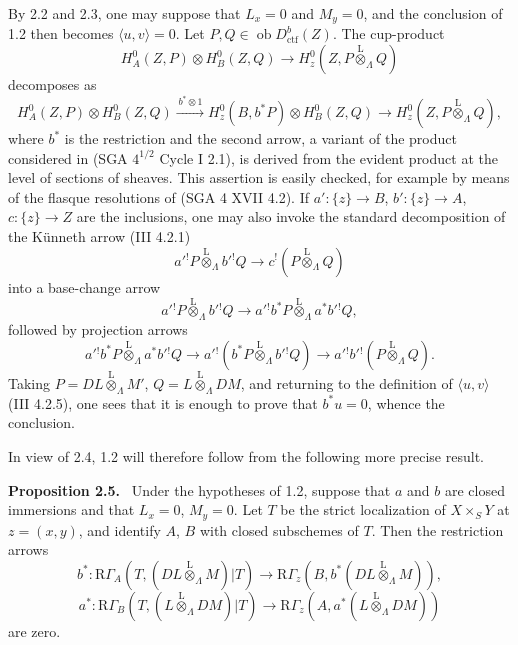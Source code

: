 \documentclass[11pt]{article}
\newenvironment{statement}[1]{\par\medskip\noindent\textbf{#1.}\ }{\par\medskip}
\providecommand{\lten}{\overset{\mathrm L}{\otimes}}
\providecommand{\Ob}{\operatorname{ob}}
\begin{document}
By 2.2 and 2.3, one may suppose that $L_x=0$ and $M_y=0$, and the conclusion of 1.2 then becomes $\langle u,v\rangle=0$. Let $P,Q\in\Ob D_{\mathrm{ctf}}^b(Z)$. The cup-product
\[
H_A^0(Z,P)\otimes H_B^0(Z,Q)\longrightarrow H_z^0(Z,P\lten_{\Lambda}Q)
\]
decomposes as
\[
H_A^0(Z,P)\otimes H_B^0(Z,Q)
 \xrightarrow{\,b^*\otimes 1\,}
H_z^0(B,b^*P)\otimes H_B^0(Z,Q)
 \longrightarrow H_z^0(Z,P\lten_{\Lambda}Q),
\]
where $b^*$ is the restriction and the second arrow, a variant of the product considered in (SGA $4^{1/2}$ Cycle I 2.1), is derived from the evident product at the level of sections of sheaves. This assertion is easily checked, for example by means of the flasque resolutions of (SGA 4 XVII 4.2). If $a':\{z\}\to B$, $b':\{z\}\to A$, $c:\{z\}\to Z$ are the inclusions, one may also invoke the standard decomposition of the Künneth arrow (III 4.2.1)
\[
a'{}^!P\lten_{\Lambda} b'{}^!Q\longrightarrow c^!(P\lten_{\Lambda}Q)
\]
into a base-change arrow
\[
a'{}^!P\lten_{\Lambda} b'{}^!Q\longrightarrow a'{}^!b^*P\lten_{\Lambda} a^*b'{}^!Q,
\]
followed by projection arrows
\[
a'{}^!b^*P\lten_{\Lambda} a^*b'{}^!Q
 \longrightarrow a'{}^!(b^*P\lten_{\Lambda} b'{}^!Q)
 \longrightarrow a'{}^!b'{}^!(P\lten_{\Lambda}Q).
\]
Taking $P=DL\lten_{\Lambda}M'$, $Q=L\lten_{\Lambda}DM$, and returning to the definition of $\langle u,v\rangle$ (III 4.2.5), one sees that it is enough to prove that $b^*u=0$, whence the conclusion.

In view of 2.4, 1.2 will therefore follow from the following more precise result.

\begin{statement}{Proposition 2.5}
Under the hypotheses of 1.2, suppose that $a$ and $b$ are closed immersions and that $L_x=0$, $M_y=0$. Let $T$ be the strict localization of $X\times_SY$ at $z=(x,y)$, and identify $A$, $B$ with closed subschemes of $T$. Then the restriction arrows
\[
b^*:\mathrm R\Gamma_A(T,(DL\lten_{\Lambda}M)|T)
 \longrightarrow \mathrm R\Gamma_z(B,b^*(DL\lten_{\Lambda}M)),
\]
\[
a^*:\mathrm R\Gamma_B(T,(L\lten_{\Lambda}DM)|T)
 \longrightarrow \mathrm R\Gamma_z(A,a^*(L\lten_{\Lambda}DM))
\]
are zero.
\end{statement}
\end{document}
